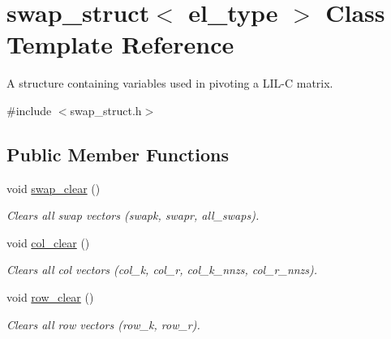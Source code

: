 \hypertarget{classswap__struct}{}\section{swap\+\_\+struct$<$ el\+\_\+type $>$ Class Template Reference}
\label{classswap__struct}


A structure containing variables used in pivoting a L\+I\+L-\/C matrix.  




{\ttfamily \#include $<$swap\+\_\+struct.\+h$>$}

\subsection*{Public Member Functions}
\begin{DoxyCompactItemize}
\item 
void \hyperlink{classswap__struct_ac67fad73735b183c372ef63b4a9cd581}{swap\+\_\+clear} ()\hypertarget{classswap__struct_ac67fad73735b183c372ef63b4a9cd581}{}\label{classswap__struct_ac67fad73735b183c372ef63b4a9cd581}

\begin{DoxyCompactList}\small\item\em Clears all swap vectors (swapk, swapr, all\+\_\+swaps). \end{DoxyCompactList}\item 
void \hyperlink{classswap__struct_ad97200ee23cd1f70668d6b4462228343}{col\+\_\+clear} ()\hypertarget{classswap__struct_ad97200ee23cd1f70668d6b4462228343}{}\label{classswap__struct_ad97200ee23cd1f70668d6b4462228343}

\begin{DoxyCompactList}\small\item\em Clears all col vectors (col\+\_\+k, col\+\_\+r, col\+\_\+k\+\_\+nnzs, col\+\_\+r\+\_\+nnzs). \end{DoxyCompactList}\item 
void \hyperlink{classswap__struct_a9727bf8ea70308977661235c59e3b8da}{row\+\_\+clear} ()\hypertarget{classswap__struct_a9727bf8ea70308977661235c59e3b8da}{}\label{classswap__struct_a9727bf8ea70308977661235c59e3b8da}

\begin{DoxyCompactList}\small\item\em Clears all row vectors (row\+\_\+k, row\+\_\+r). \end{DoxyCompactList}\end{DoxyCompactItemize}
